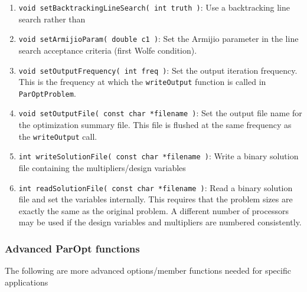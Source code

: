 \documentclass[12pt]{article}
\begin{document}
\begin{enumerate}
\item \texttt{void setBacktrackingLineSearch( int truth )}: Use a backtracking line search rather than 

\item \texttt{void setArmijioParam( double c1 )}: Set the Armijio parameter in the line search acceptance criteria (first Wolfe condition).

\item \texttt{void setOutputFrequency( int freq )}: Set the output iteration frequency. This is the frequency at which the \texttt{writeOutput} function is called in \texttt{ParOptProblem}.

\item \texttt{void setOutputFile( const char *filename )}: Set the output file name for the optimization summary file. This file is flushed at the same frequency as the \texttt{writeOutput} call.

\item \texttt{int writeSolutionFile( const char *filename )}: Write a binary solution file containing the multipliers/design variables

\item \texttt{int readSolutionFile( const char *filename )}: Read a binary solution file and set the variables internally. This requires that the problem sizes are exactly the same as the original problem. A different number of processors may be used if the design variables and multipliers are numbered consistently. 
\end{enumerate}

\subsubsection{Advanced ParOpt functions}

The following are more advanced options/member functions needed for specific applications
\end{document}
